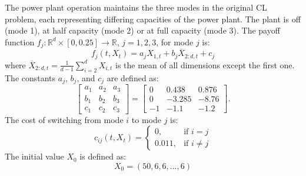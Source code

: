 \documentclass[11pt,reqno,a4paper]{amsart}
\theoremstyle{definition}
\numberwithin{equation}{section}
\newcommand{\widebar}[1]{\overline{#1}}
\DeclareMathOperator{\1}{\mathbbm{1}}
\begin{document}
The power plant operation maintains the three modes in the original CL problem, each representing differing capacities of the power plant. The plant is off (mode 1), at half capacity (mode 2) or at full capacity (mode 3).
The payoff function $f_j : \mathbb{R}^d \times [0,0.25] \to \mathbb{R}$, $j=1,2,3$, for mode $j$ is:
\begin{equation}
  f_j(t,X_t) = a_j X_{1,t} + b_j \widebar{X}_{2:d,t} + c_j
\end{equation}
where $\widebar{X}_{2:d,t} = \frac{1}{d-1} \sum_{i=2}^d X_{i,t}$ is the mean of all dimensions except the first one. The constants $a_j$, $b_j$, and $c_j$ are defined as:
\begin{equation}
  \begin{bmatrix}
    a_1 & a_2 & a_3 \\
    b_1 & b_2 & b_3 \\
    c_1 & c_2 & c_3
  \end{bmatrix} =
  \begin{bmatrix}
    0  & 0.438  & 0.876 \\
    0  & -3.285 & -8.76 \\
    -1 & -1.1   & -1.2
  \end{bmatrix}.
\end{equation}
The cost of switching from mode $i$ to mode $j$ is:
\begin{equation}
  c_{ij}(t,X_t) =
  \begin{cases}
    0,     & \text{if } i = j    \\
    0.011, & \text{if } i \neq j
  \end{cases}
\end{equation}
The initial value $X_0$ is defined as:
\begin{equation}
  X_0 = (50,6,6,\dots,6)
\end{equation}
\end{document}

